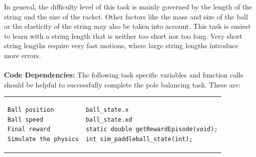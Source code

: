 \documentclass[11pt, article, colorback]{article}
\begin{document}
In general, the difficulty level of this task is mainly governed by the length of the string and the size of the racket. Other factors 
like the mass and size of the ball or the elasticity of the string may also be taken into account. This task is easiest to learn with 
a string length that is neither too short nor too long. Very short string lengths require very fast motions, where large string lengths 
introduce more errors. 
		\\  \\
%
\textbf{Code Dependencies:} The following task specific variables and function calls should be helpful to 
successfully complete the pole balancing task. These are: \\
\begin{tabular}{ m{7cm} m{4cm}}
\begin{lstlisting}
Ball position
Ball speed
Final reward
Simulate the physics
\end{lstlisting}
& \begin{lstlisting}
ball_state.x
ball_state.xd
static double getRewardEpisode(void);
int sim_paddleball_state(int);
\end{lstlisting}
\end{tabular} \\
\end{document}
